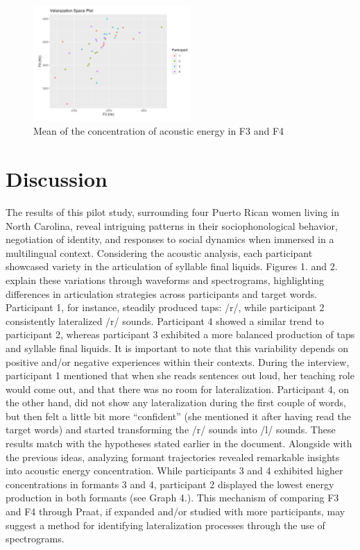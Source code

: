 \documentclass[
  a4paper,
  11pt,
  twocolumn]{article}
\begin{document}
\begin{figure}[!ht]
\begin{center}
\includegraphics[width=6cm]{./includes/figures/graph3.png}
\caption{Mean of the concentration of acoustic energy in F3 and F4}\label{fig:vowels}
\end{center}
\end{figure}

\section{Discussion}

The results of this pilot study, surrounding four Puerto Rican women
living in North Carolina, reveal intriguing patterns in their
sociophonological behavior, negotiation of identity, and responses to
social dynamics when immersed in a multilingual context. Considering the
acoustic analysis, each participant showcased variety in the
articulation of syllable final liquids. Figures 1. and 2. explain these
variations through waveforms and spectrograms, highlighting differences
in articulation strategies across participants and target words.
Participant 1, for instance, steadily produced taps: /r/, while
participant 2 consistently lateralized /r/ sounds. Participant 4 showed
a similar trend to participant 2, whereas participant 3 exhibited a more
balanced production of taps and syllable final liquids. It is important
to note that this variability depends on positive and/or negative
experiences within their contexts. During the interview, participant 1
mentioned that when she reads sentences out loud, her teaching role
would come out, and that there was no room for lateralization.
Participant 4, on the other hand, did not show any lateralization during
the first couple of words, but then felt a little bit more ``confident''
(she mentioned it after having read the target words) and started
transforming the /r/ sounds into /l/ sounds. These results match with
the hypotheses stated earlier in the document. Alongside with the
previous ideas, analyzing formant trajectories revealed remarkable
insights into acoustic energy concentration. While participants 3 and 4
exhibited higher concentrations in formants 3 and 4, participant 2
displayed the lowest energy production in both formants (see Graph 4.).
This mechanism of comparing F3 and F4 through Praat, if expanded and/or
studied with more participants, may suggest a method for identifying
lateralization processes through the use of spectrograms.
\end{document}
